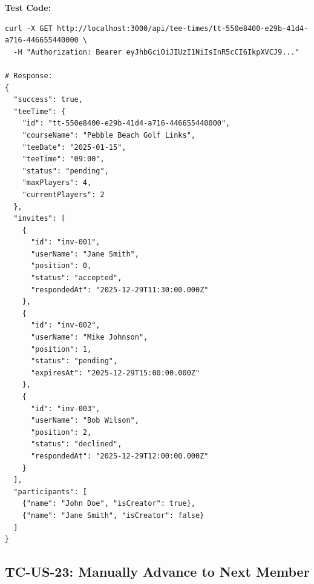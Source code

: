 \documentclass[11pt,a4paper]{article}
\begin{document}
\vspace{0.3cm}
\textbf{Test Code:}
\begin{lstlisting}
curl -X GET http://localhost:3000/api/tee-times/tt-550e8400-e29b-41d4-a716-446655440000 \
  -H "Authorization: Bearer eyJhbGciOiJIUzI1NiIsInR5cCI6IkpXVCJ9..."

# Response:
{
  "success": true,
  "teeTime": {
    "id": "tt-550e8400-e29b-41d4-a716-446655440000",
    "courseName": "Pebble Beach Golf Links",
    "teeDate": "2025-01-15",
    "teeTime": "09:00",
    "status": "pending",
    "maxPlayers": 4,
    "currentPlayers": 2
  },
  "invites": [
    {
      "id": "inv-001",
      "userName": "Jane Smith",
      "position": 0,
      "status": "accepted",
      "respondedAt": "2025-12-29T11:30:00.000Z"
    },
    {
      "id": "inv-002",
      "userName": "Mike Johnson",
      "position": 1,
      "status": "pending",
      "expiresAt": "2025-12-29T15:00:00.000Z"
    },
    {
      "id": "inv-003",
      "userName": "Bob Wilson",
      "position": 2,
      "status": "declined",
      "respondedAt": "2025-12-29T12:00:00.000Z"
    }
  ],
  "participants": [
    {"name": "John Doe", "isCreator": true},
    {"name": "Jane Smith", "isCreator": false}
  ]
}
\end{lstlisting}

\vspace{0.5cm}


\subsection{TC-US-23: Manually Advance to Next Member}
\end{document}
